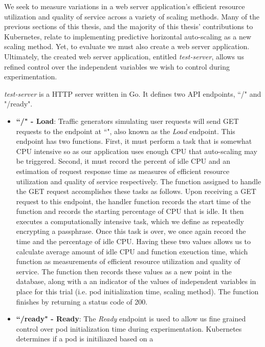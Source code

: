 We seek to measure variations in a web server application's
efficient resource utilization and quality of service across a variety of
scaling methods. Many of the previous sections of this thesis, and the majority
of this thesis' contributions to Kubernetes, relate to implementing predictive
horizontal auto-scaling as a new scaling method. Yet, to evaluate we must also
create a web server application. Ultimately, the created web server application,
entitled \textit{test-server}, allows us refined control over the independent
variables we wish to control during experimentation.

\textit{test-server} is a HTTP server written in Go. It defines two API
endpoints, ``/" and "/ready".

\begin{itemize}
  \item \textbf{``/" - Load}: Traffic generators simulating user requests will
    send GET requests to the endpoint at ``\/", also known as the \textit{Load} endpoint.
    This endpoint has two functions. First, it must perform a task that is
    somewhat CPU intensive so as our application uses enough CPU that
    auto-scaling may be triggered. Second, it must record the percent of idle CPU
    and an estimation of request response time as measures of
    efficient resource utilization and quality of service respectively. The
    function assigned to handle the GET request accomplishes these tasks as
    follows. Upon receiving a GET request to this endpoint, the handler function
    records the start time of the function and records the starting percentage
    of CPU that is idle. It then executes a computationally intensive
    task, which we define as repeatedly encrypting a passphrase. Once this task
    is over, we once again record the time and the percentage of idle CPU.
    Having these two values allows us to calculate average amount of idle CPU
    and function exeuction time, which function as measurements of
    efficient resource utilization and quality of service. The function then
    records these values as a new point in the database, along with a
    an indicator of the values of independent variables in place for this trial
    (i.e. pod initialization time, scaling method). The function finishes by
    returning a status code of 200.
  \item \textbf{``/ready" - Ready}: The \textit{Ready} endpoint is used to allow
    us fine grained control over pod initialization time during experimentation.
    Kubernetes determines if a pod is initiliazed based on a

\end{itemize}
